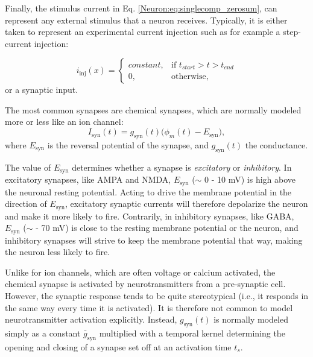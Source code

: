 \subsubsection{}
\label{sec:Neuron:stim}
Finally, the stimulus current in Eq. \ref{Neuron:eq:singlecomp_zerosum}, can represent any external stimulus that a neuron receives. Typically, it is either taken to represent an experimental current injection such as for example a step-current injection:

\begin{equation}
i_\text{inj}(x)= 
\begin{cases}
    constant, & \text{if } t_{start} > t > t_{end} \\
    0,              & \text{otherwise},
\end{cases}
\label{Neuron:eq:injected}
\end{equation}
or a synaptic input. 

The most common synapses are chemical synapses, which are normally modeled more or less like an ion channel:
\begin{equation}
I_\text{syn}(t) = g_\text{syn}(t) \big( \phi_m(t)-E_\text{syn} \big), 
\label{Neuron:eq:chemicalsynapse}
\end{equation}
where $E_\text{syn}$ is the reversal potential of the synapse, and $g_\text{syn}(t)$ the conductance. 

The value of $E_\text{syn}$ determines whether a synapse is \textit{excitatory} or \textit{inhibitory}. In excitatory synapses, like 
AMPA and NMDA, $E_\text{syn}$ ($\sim$ 0 - 10 mV) is high above the neuronal resting potential. Acting to drive the membrane potential in the direction of $E_\text{syn}$, excitatory synaptic currents will therefore depolarize the neuron and make it more likely to fire. Contrarily, in inhibitory synapses, like GABA, $E_\text{syn}$ ($\sim$ - 70 mV) is close to the resting membrane potential or the neuron, and inhibitory synapses will strive to keep the membrane potential that way, making the neuron less likely to fire.

Unlike for ion channels, which are often voltage or calcium activated, the chemical synapse is activated by neurotransmitters from a pre-synaptic cell. However, the synaptic response tends to be quite stereotypical (i.e., it responds in the same way every time it is activated). It is therefore not common to model neurotransmitter activation explicitly. Instead, $g_\text{syn}(t)$ is normally modeled simply as a constant $\bar{g}_\text{syn}$ multiplied with a temporal kernel determining the opening and closing of a synapse set off at an activation time $t_s$. 

